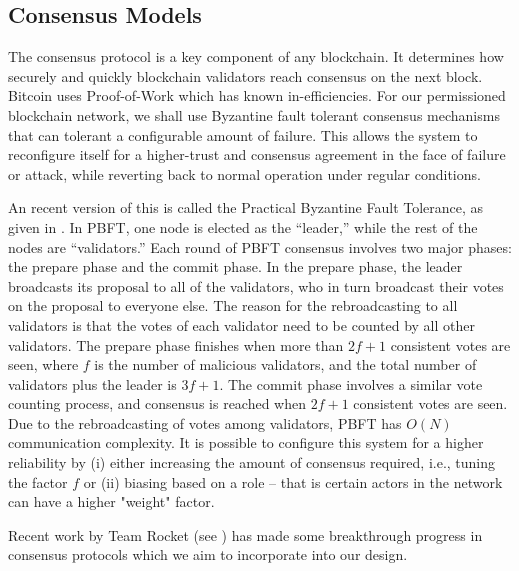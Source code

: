 \subsection{Consensus Models}

The consensus protocol is a key component of any blockchain. It determines how securely and
quickly blockchain validators reach consensus on the next block. Bitcoin uses Proof-of-Work which
has known in-efficiencies. For our permissioned blockchain network, we shall use Byzantine fault tolerant 
consensus mechanisms that can tolerant a configurable amount of failure. This allows the system
to reconfigure itself for a higher-trust and consensus agreement in the face of failure or attack, while
reverting back to normal operation under regular conditions.

An recent version of this is called the Practical Byzantine Fault Tolerance, as given in \cite{castro1999}. In PBFT, one
node is elected as the “leader,” while the rest of the nodes are “validators.” Each round of PBFT consensus involves two
major phases: the prepare phase and the commit phase. In the prepare phase, the leader broadcasts its proposal to all of
the validators, who in turn broadcast their votes on the proposal to everyone else. The reason for the rebroadcasting to
all validators is that the votes of each validator need to be counted by all other validators. The prepare phase
finishes when more than $2f + 1$ consistent votes are seen, where $f$ is the number of malicious validators, and the
total number of validators plus the leader is $3f + 1$. The commit phase involves a similar vote counting process, and
consensus is reached when $2f + 1$ consistent votes are seen. Due to the rebroadcasting of votes among validators, PBFT
has $O(N)$ communication complexity. It is possible to configure this system for a higher reliability by (i) either
increasing the amount of consensus required, i.e., tuning the factor $f$ or (ii) biasing based on a role -- that is
certain actors in the network can have a higher "weight" factor.

Recent work by Team Rocket (see \cite{ava2018}) has made some breakthrough progress in consensus protocols which we aim
to incorporate into our design.

